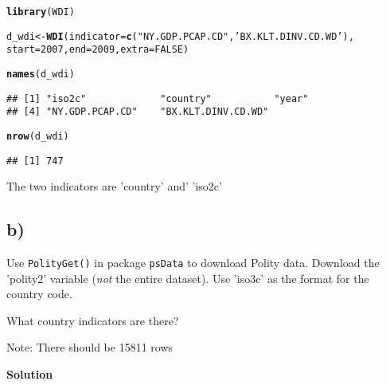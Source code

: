 \documentclass{article}\usepackage[]{graphicx}\usepackage[]{color}
\makeatletter
\newcommand{\hlnum}[1]{\textcolor[rgb]{0.686,0.059,0.569}{#1}}%
\newcommand{\hlstr}[1]{\textcolor[rgb]{0.192,0.494,0.8}{#1}}%
\newcommand{\hlstd}[1]{\textcolor[rgb]{0.345,0.345,0.345}{#1}}%
\newcommand{\hlkwb}[1]{\textcolor[rgb]{0.69,0.353,0.396}{#1}}%
\newcommand{\hlkwc}[1]{\textcolor[rgb]{0.333,0.667,0.333}{#1}}%
\newcommand{\hlkwd}[1]{\textcolor[rgb]{0.737,0.353,0.396}{\textbf{#1}}}%
\newenvironment{kframe}{%
 \def\at@end@of@kframe{}%
 \ifinner\ifhmode%
  \def\at@end@of@kframe{\end{minipage}}%
  \begin{minipage}{\columnwidth}%
 \fi\fi%
 \def\FrameCommand##1{\hskip\@totalleftmargin \hskip-\fboxsep
 \colorbox{shadecolor}{##1}\hskip-\fboxsep
     \hskip-\linewidth \hskip-\@totalleftmargin \hskip\columnwidth}%
 \MakeFramed {\advance\hsize-\width
   \@totalleftmargin\z@ \linewidth\hsize
   \@setminipage}}%
 {\par\unskip\endMakeFramed%
 \at@end@of@kframe}
\newenvironment{knitrout}{}{} %
\makeatother
\begin{document}
\begin{knitrout}
\color{fgcolor}\begin{kframe}
\begin{alltt}
\hlkwd{library}\hlstd{(WDI)}
\end{alltt}


{\ttfamily\noindent\itshape\color{messagecolor}{\#\# Loading required package: RJSONIO}}\begin{alltt}
\hlstd{d_wdi} \hlkwb{<-} \hlkwd{WDI}\hlstd{(}\hlkwc{indicator} \hlstd{=} \hlkwd{c}\hlstd{(}\hlstr{"NY.GDP.PCAP.CD"}\hlstd{,} \hlstr{'BX.KLT.DINV.CD.WD'}\hlstd{),}
             \hlkwc{start} \hlstd{=} \hlnum{2007}\hlstd{,} \hlkwc{end} \hlstd{=} \hlnum{2009}\hlstd{,} \hlkwc{extra} \hlstd{=} \hlnum{FALSE}\hlstd{)}

\hlkwd{names}\hlstd{(d_wdi)}
\end{alltt}
\begin{verbatim}
## [1] "iso2c"             "country"           "year"             
## [4] "NY.GDP.PCAP.CD"    "BX.KLT.DINV.CD.WD"
\end{verbatim}
\begin{alltt}
\hlkwd{nrow}\hlstd{(d_wdi)}
\end{alltt}
\begin{verbatim}
## [1] 747
\end{verbatim}
\end{kframe}
\end{knitrout}

The two indicators are 'country' and' 'iso2c'

\subsection*{b)}

Use \verb`PolityGet()` in package \verb`psData` to download Polity data. Download the 'polity2' variable (\textit{not} the entire dataset). Use 'iso3c' as the format for the country code.

What country indicators are there?

Note: There should be 15811 rows

\textbf{Solution}
\end{document}
